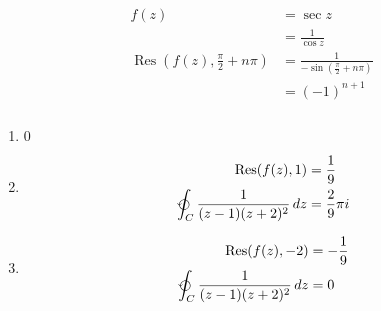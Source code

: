 \documentclass{article}
\newcommand{\Res}{\operatorname{Res}}
\begin{document}
\setcounter{subsubsection}{14}
\subsubsection{}

\begin{align*}
  f(z)                                            & = \sec z                                               \\
                                                  & = \frac{1}{\cos z}                                     \\
  \Res \left( f(z), \frac{\pi}{2} + n \pi \right) & = \frac{1}{-\sin \left( \frac{\pi}{2} + n \pi \right)} \\
                                                  & = (-1)^{n + 1}
\end{align*}

\setcounter{subsubsection}{16}
\subsubsection{}

\begin{enumerate}
  \item $0$

  \item

        \begin{align*}
          \Res(f(z), 1)                                            & = \frac{1}{9}       \\
          \varointctrclockwise_C \frac{1}{(z - 1) (z + 2)^2} \,d z & = \frac{2}{9} \pi i
        \end{align*}

  \item

        \begin{align*}
          \Res(f(z), -2)                                           & = -\frac{1}{9} \\
          \varointctrclockwise_C \frac{1}{(z - 1) (z + 2)^2} \,d z & = 0
        \end{align*}
\end{enumerate}

\setcounter{subsubsection}{18}
\subsubsection{}
\end{document}
